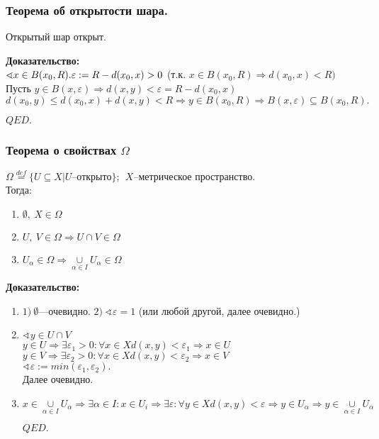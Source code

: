 \documentclass{article}
\begin{document}
\subsubsection{Теорема об открытости шара.}
Открытый шар открыт.
\begin{spacing}{1.5}
 \textbf{Доказательство:}\\
$\sphericalangle x\in B(x_{0}, R).  \\
  \varepsilon :=R-d(x_{0}, x)>0 $
 (т.к. $x\in B(x_{0}, R)\Rightarrow d(x_{0}, x)<R)$
 \\Пусть $y\in B(x, \varepsilon)\Rightarrow d(x, y)<\varepsilon = R-d(x_{0}, x) $
 \\$d(x_{0}, y)\leq d(x_{0}, x)+d(x, y)<R\Rightarrow y\in B(x_{0}, R)\Rightarrow B(x, \varepsilon)\subseteq B(x_{0}, R). $
\begin{flushright}
$QED.$
\end{flushright}
\subsubsection{Теорема о свойствах $\Omega$}
$\Omega \overset{def}{=} \lbrace U\subseteq X | U$--открыто$\rbrace;~~X$--метрическое пространство.
\\Тогда:
\begin{enumerate}
\item $\emptyset ,~X\in \Omega$
\item $U,~V\in \Omega \Rightarrow U\cap V\in \Omega$
\item $U_{\alpha}\in \Omega \Rightarrow \underset{\alpha\in I}{\cup}U_{\alpha}\in \Omega$
\end{enumerate}
 \textbf{Доказательство:}
 \begin{enumerate}
 	\item 
 	$1)~\emptyset$---очевидно.
 	$2)~\sphericalangle \varepsilon=1$ (или любой другой, далее очевидно.)
 	\item $\sphericalangle y\in U\cap V$
 	\\$y\in U \Rightarrow \exists \varepsilon_{1}>0:\forall x\in X d(x, y)<\varepsilon_{1}\Rightarrow x\in U$
 	\\$y\in V \Rightarrow \exists \varepsilon_{2}>0:\forall x\in X d(x, y)<\varepsilon_{2}\Rightarrow x\in V$
 	\\$\sphericalangle \varepsilon:=min(\varepsilon_{1}, \varepsilon_{2}).$
 	\\Далее очевидно.
 	\item $x\in \underset{\alpha\in I}{\cup}U_{\alpha}\Rightarrow \exists\alpha\in I: x\in U_{i}\Rightarrow\exists\varepsilon : \forall y\in X d(x, y)<\varepsilon\Rightarrow y\in U_{\alpha}\Rightarrow y\in \underset{\alpha\in I}{\cup}U_{\alpha} $
 	\begin{flushright}
$QED.$
\end{flushright}
\end{enumerate}

\end{spacing}
\end{document}
